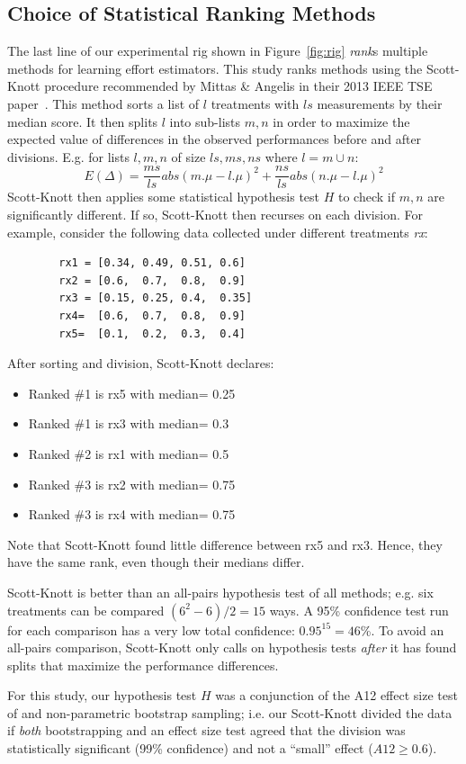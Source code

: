 \documentclass[smallcondesed]{svjour3}
\newcommand{\bi}{\begin{itemize}[leftmargin=0.4cm]}
\newcommand{\ei}{\end{itemize}}
\newcommand{\fig}[1]{Figure~\ref{fig:#1}}
\begin{document}
\subsection{Choice of Statistical Ranking Methods}\label{sect:stats}
The last line of our experimental rig shown in
\fig{rig} {\em rank}s multiple methods for learning
effort estimators.
This study ranks methods using the Scott-Knott
procedure recommended by Mittas \& Angelis in their 2013
IEEE TSE paper~\cite{mittas13}.  This method
sorts a list of $l$ treatments with $ls$ measurements by their median
score. It then
splits $l$ into sub-lists $m,n$ in order to maximize the expected value of
 differences  in the observed performances
before and after divisions. E.g. for lists $l,m,n$ of size $ls,ms,ns$ where $l=m\cup n$:
 \[E(\Delta)=\frac{ms}{ls}abs(m.\mu - l.\mu)^2 + \frac{ns}{ls}abs(n.\mu - l.\mu)^2\]
Scott-Knott then applies some statistical hypothesis test $H$ to check
if $m,n$ are significantly different. If so, Scott-Knott then recurses on each division.
For example, consider the following data collected under different treatments {\em rx}:

{\small \begin{verbatim}
        rx1 = [0.34, 0.49, 0.51, 0.6]
        rx2 = [0.6,  0.7,  0.8,  0.9]
        rx3 = [0.15, 0.25, 0.4,  0.35]
        rx4=  [0.6,  0.7,  0.8,  0.9]
        rx5=  [0.1,  0.2,  0.3,  0.4]
\end{verbatim}}
\noindent
After sorting and division, Scott-Knott declares:
\bi
\item Ranked \#1 is rx5 with median= 0.25
\item Ranked \#1 is rx3 with median= 0.3
\item Ranked \#2 is rx1 with median= 0.5
\item Ranked \#3 is rx2 with median= 0.75
\item Ranked \#3 is rx4 with median= 0.75
\ei
Note that Scott-Knott found  little
difference between rx5 and rx3. Hence,
they have the same rank, even though their medians differ.

Scott-Knott is better than an 
 all-pairs hypothesis test of all methods; e.g. six treatments
can be compared \mbox{$(6^2-6)/2=15$} ways. 
A 95\% confidence test run for each comparison has  a very low total confidence: 
\mbox{$0.95^{15} = 46$}\%.
To avoid an all-pairs comparison, Scott-Knott only calls on hypothesis
tests {\em after} it has found splits that maximize the performance differences.
 
For this study, our hypothesis test $H$ was a
conjunction of the A12 effect size test of  and
non-parametric bootstrap sampling; i.e. our
Scott-Knott divided the data if {\em both}
bootstrapping and an effect size test agreed that
the division was statistically significant (99\%
confidence) and not a ``small'' effect ($A12 \ge
0.6$).
\end{document}
